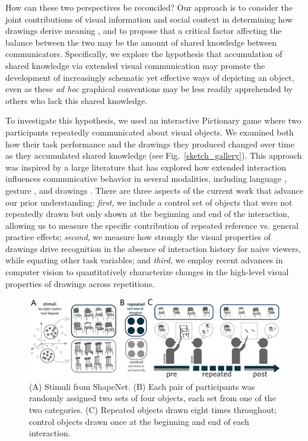 \documentclass[11pt,letterpaper]{article}
\begin{document}
How can these two perspectives be reconciled?
Our approach is to consider the joint contributions of visual information and social context in determining how drawings derive meaning \cite{abell2009canny}, and to propose that a critical factor affecting the balance between the two may be the amount of shared knowledge between communicators.
Specifically, we explore the hypothesis that accumulation of shared knowledge via extended visual communication may promote the development of increasingly schematic yet effective ways of depicting an object, even as these \textit{ad hoc} graphical conventions may be less readily apprehended by others who lack this shared knowledge.

To investigate this hypothesis, we used an interactive Pictionary game where two participants repeatedly communicated about visual objects.
We examined both how their task performance and the drawings they produced changed over time as they accumulated shared knowledge (see Fig.~\ref{sketch_gallery}).
This approach was inspired by a large literature that has explored how extended interaction influences communicative behavior in several modalities, including language \cite{ClarkWilkesGibbs86_ReferringCollaborative,hawkins2020characterizing}, gesture \cite{goldin1996silence}, and drawings \cite{garrod_foundations_2007,galantucci2005experimental}.
There are three aspects of the current work that advance our prior understanding: \emph{first}, we include a control set of objects that were not repeatedly drawn but only shown at the beginning and end of the interaction, allowing us to measure the specific contribution of repeated reference vs. general practice effects; \emph{second}, we measure how strongly the visual properties of drawings drive recognition in the absence of interaction history for naive viewers, while equating other task variables; and \emph{third}, we employ recent advances in computer vision to quantitatively characterize changes in the high-level visual properties of drawings across repetitions.




\begin{figure}
\begin{center}
\includegraphics[width=1\linewidth]{figures/task_stimuli.pdf}
\caption{(A) Stimuli from ShapeNet. (B) Each pair of participants was randomly assigned two sets of four objects, each set from one of the two categories. (C) Repeated objects drawn eight times throughout; control objects drawn once at the beginning and end of each interaction.}
\label{task_stimuli}
\end{center}
\end{figure}
\end{document}
